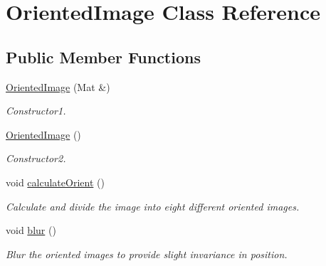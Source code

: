 \hypertarget{classOrientedImage}{\section{\-Oriented\-Image \-Class \-Reference}
\label{classOrientedImage}
}
\subsection*{\-Public \-Member \-Functions}
\begin{DoxyCompactItemize}
\item 
\hypertarget{classOrientedImage_a0250f06f59ff8ce4a310834fada6fd41}{\hyperlink{classOrientedImage_a0250f06f59ff8ce4a310834fada6fd41}{\-Oriented\-Image} (\-Mat \&)}\label{classOrientedImage_a0250f06f59ff8ce4a310834fada6fd41}

\begin{DoxyCompactList}\small\item\em \-Constructor1. \end{DoxyCompactList}\item 
\hypertarget{classOrientedImage_a58e2b66d1d1817cbe9c7d6b86b57f31e}{\hyperlink{classOrientedImage_a58e2b66d1d1817cbe9c7d6b86b57f31e}{\-Oriented\-Image} ()}\label{classOrientedImage_a58e2b66d1d1817cbe9c7d6b86b57f31e}

\begin{DoxyCompactList}\small\item\em \-Constructor2. \end{DoxyCompactList}\item 
\hypertarget{classOrientedImage_a2f50d2c5e6ee25ed0a239e6980220d88}{void \hyperlink{classOrientedImage_a2f50d2c5e6ee25ed0a239e6980220d88}{calculate\-Orient} ()}\label{classOrientedImage_a2f50d2c5e6ee25ed0a239e6980220d88}

\begin{DoxyCompactList}\small\item\em \-Calculate and divide the image into eight different oriented images. \end{DoxyCompactList}\item 
\hypertarget{classOrientedImage_a932bbc6e7b63ff588cac141cbcc1106d}{void \hyperlink{classOrientedImage_a932bbc6e7b63ff588cac141cbcc1106d}{blur} ()}\label{classOrientedImage_a932bbc6e7b63ff588cac141cbcc1106d}

\begin{DoxyCompactList}\small\item\em \-Blur the oriented images to provide slight invariance in position. \end{DoxyCompactList}\end{DoxyCompactItemize}
